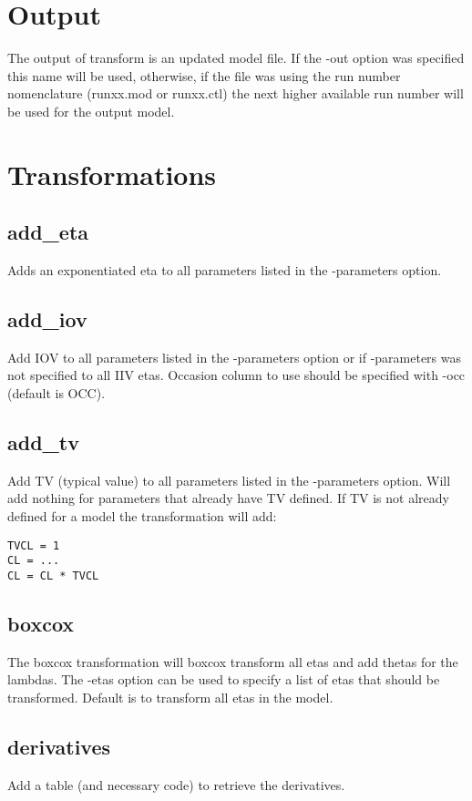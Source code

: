 \section{Output}
The output of transform is an updated model file. If the -out option was specified this name will be used, otherwise, if the file was using the run number nomenclature (runxx.mod or runxx.ctl) the next higher available run number will be used for the output model.

\section{Transformations}
\subsection{add\_eta}
Adds an exponentiated eta to all parameters listed in the -parameters option.

\subsection{add\_iov}
Add IOV to all parameters listed in the -parameters option or if -parameters was not specified to all IIV etas. Occasion column to use should be specified with -occ (default is OCC).

\subsection{add\_tv}
Add TV (typical value) to all parameters listed in the -parameters option. Will add nothing for parameters that already have TV defined. If TV is not already defined for a model the transformation will add:
\begin{verbatim}
TVCL = 1
CL = ...
CL = CL * TVCL
\end{verbatim}

\subsection{boxcox}
The boxcox transformation will boxcox transform all etas and add thetas for the lambdas. The -etas option can be used to specify a list of etas that should be transformed. Default is to transform all etas in the model.

\subsection{derivatives}
Add a table (and necessary code) to retrieve the derivatives.

